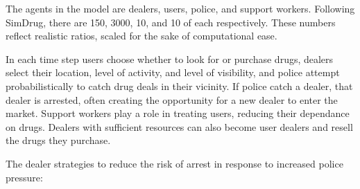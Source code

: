 \documentclass[runningheads,a4paper]{llncs}
\begin{document}
The agents in the model are dealers, users, police, and support workers. Following SimDrug, there are 150, 3000, 10, and 10 of each respectively. These numbers reflect realistic ratios, scaled for the sake of computational ease.

In each time step users choose whether to look for or purchase drugs, dealers select their location, level of activity, and level of visibility, and police attempt probabilistically to catch drug deals in their vicinity. If police catch a dealer, that dealer is arrested, often creating the opportunity for a new dealer to enter the market. Support workers play a role in treating users, reducing their dependance on drugs. Dealers with sufficient resources can also become user dealers and resell the drugs they purchase.





%

The dealer strategies to reduce the risk of arrest in response to increased police pressure:
\end{document}
